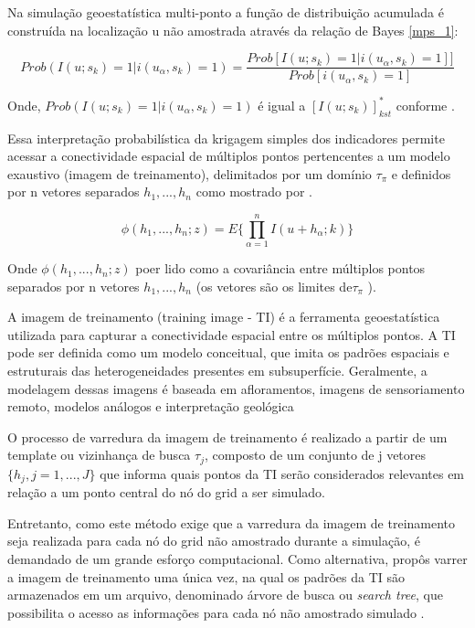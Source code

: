 Na simulação geoestatística multi-ponto a função de distribuição acumulada é construída na localização u não amostrada através da relação de Bayes \autoref{mps_1}:

\begin{equation}
	Prob(I(u;s_{k})=1|i(u_{\alpha}, s_{k})=1)=\frac{Prob[I(u;s_{k})=1|i(u_{\alpha}, s_{k})=1]]}{Prob[i(u_{\alpha}, s_{k})=1]}
	\label{mps_1}
\end{equation}

Onde, $	Prob(I(u;s_{k})=1|i(u_{\alpha}, s_{k})=1)$ é igual a $[I(u;s_{k})]^{*}_{kst}$ conforme .

Essa interpretação probabilística da krigagem simples dos indicadores permite acessar a conectividade espacial de múltiplos pontos pertencentes a um modelo exaustivo (imagem de treinamento), delimitados por um domínio $\tau_{\pi}$ e definidos por n vetores separados $h_{1}, ..., h_{n}$ como mostrado por .

\begin{equation}
	\phi(h_{1}, ..., h_{n};z)=E\{\prod_{\alpha=1}^{n}I(u+h_{\alpha};k)\}
\end{equation}

Onde $\phi(h_{1}, ..., h_{n};z)$ poer lido como a covariância entre múltiplos pontos separados por n vetores $h_{1}, ..., h_{n}$ (os vetores são os limites de$\tau_{\pi}$ ).

A imagem de treinamento (training image - TI) é a ferramenta geoestatística utilizada para capturar a conectividade espacial entre os múltiplos pontos. A TI pode ser definida como um modelo conceitual, que imita os padrões espaciais e estruturais das heterogeneidades presentes em subsuperfície. Geralmente, a modelagem dessas imagens é baseada em afloramentos, imagens de sensoriamento remoto, modelos análogos e interpretação geológica

O processo de varredura da imagem de treinamento é realizado a partir de um template ou vizinhança de busca $\tau_{j}$, composto de um conjunto de j vetores $\{h_j, j=1,...,J\}$ que informa quais pontos da TI serão considerados relevantes em relação a um ponto central  do nó do grid a ser simulado.

Entretanto, como este método exige que a varredura da imagem de treinamento seja realizada para cada nó do grid não amostrado durante a simulação, é demandado de um grande esforço computacional. Como alternativa,  propôs varrer a imagem de treinamento uma única vez, na qual os padrões da TI são armazenados em um arquivo, denominado árvore de busca ou \textit{search tree}, que possibilita o acesso as informações para cada nó não amostrado simulado \cite{amarante_dissertacao}.

